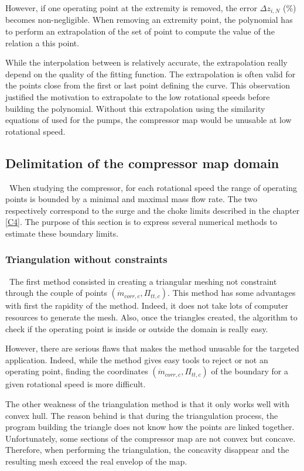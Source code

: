 However, if one operating point at the extremity is removed, the error $\Delta z_{i,N}$ (\%) becomes non-negligible. When removing an extremity point, the polynomial has to perform an extrapolation of the set of point to compute the value of the relation a this point. 

While the interpolation between is relatively accurate, the extrapolation really depend on the quality of the fitting function. The extrapolation is often valid for the points close from the first or last point defining the curve. This observation justified the motivation to extrapolate to the low rotational speeds before building the polynomial. Without this extrapolation using the similarity equations of used for the pumps, the compressor map would be unusable at low rotational speed. 

\subsection{Delimitation of the compressor map domain}
\quad\ When studying the compressor, for each rotational speed the range of operating points is bounded by a minimal and maximal mass flow rate. The two respectively correspond to the surge and the choke limits described in the chapter \ref{C4}. The purpose of this section is to express several numerical methods to estimate these boundary limits.

\subsubsection{Triangulation without constraints}
\quad\ The first method consisted in creating a triangular meshing not constraint through the couple of points $(\dot{m}_{corr,c},\Pi_{tt,c})$. This method has some advantages with first the rapidity of the method. Indeed, it does not take lots of computer resources to generate the mesh. Also, once the triangles created, the algorithm to check if the operating point is inside or outside the domain is really easy.

However, there are serious flaws that makes the method unusable for the targeted application. Indeed, while the method gives easy tools to reject or not an operating point, finding the coordinates $(\dot{m}_{corr,c},\Pi_{tt,c})$ of the boundary for a given rotational speed is more difficult. 

The other weakness of the triangulation method is that it only works well with convex hull. The reason behind is that during the triangulation process, the program building the triangle does not know how the points are linked together. Unfortunately, some sections of the compressor map are not convex but concave. Therefore, when performing the triangulation, the concavity disappear and the resulting mesh exceed the real envelop of the map.

